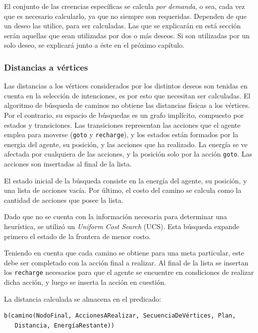 \documentclass[oneside]{book}
\theoremstyle{definition}
\theoremstyle{example}
\begin{document}
\label{sec:creenciasEspecificas}

El conjunto de las creencias específicas se calcula \textit{por demanda}, o sea, 
cada vez que es necesario calcularlo, ya que no siempre son requeridas. Dependen
de que un deseo las utilice, para ser calculadas. Las que se explicarán en está
sección serán aquellas que sean utilizadas por dos o más deseos. Si son 
utilizadas por un solo deseo, se explicará junto a éste en el próximo capítulo.

\subsubsection{Distancias a vértices}

Las distancias a los vértices considerados por los distintos deseos son tenidas en 
cuenta en la selección de intenciones, es por esto que necesitan ser calculadas.
El algoritmo de búsqueda de caminos no obtiene las distancias físicas a los vértices.
Por el contrario, su espacio de búsquedas es un grafo implícito, compuesto por estados
y transiciones. Las transiciones representan las acciones que el agente emplea
para moverse (\texttt{goto} y \texttt{recharge}), y los estados están formados por 
la energia del agente, su posición, y las acciones que ha realizado. La energía se ve
afectada por cualquiera de las acciones, y la posición solo por la acción \texttt{goto}.
Las acciones son insertadas al final de la lista.

El estado inicial de la búsqueda consiste en la energía del agente, su posición, y una 
lista de acciones vacía. Por último, el costo del camino se calcula como la cantidad de 
acciones que posee la lista.

Dado que no se cuenta con la información necesaria para determinar una heurística, se 
utilizó un \textit{Uniform Cost Search} (UCS). Esta búsqueda expande primero el estado
de la frontera de menor costo.

Teniendo en cuenta que cada camino se obtiene para una meta particular, este debe ser
completado con la acción final a realizar. Al final de la lista se insertan los 
\texttt{recharge} necesarios para que el agente se encuentre en condiciones de realizar 
dicha acción, y luego se inserta la acción en cuestión.

La distancia calculada se almacena en el predicado:

\begin{verbatim}
b(camino(NodoFinal, AccionesARealizar, SecuenciaDeVértices, Plan, 
   Distancia, EnergíaRestante))
\end{verbatim}
\end{document}
